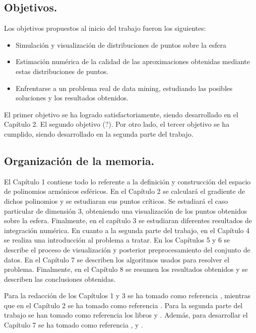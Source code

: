 \subsection{Objetivos.}
Los objetivos propuestos al inicio del trabajo fueron los siguientes:
\begin{itemize}
	\item Simulación y visualización de distribuciones de puntos sobre la esfera
	\item Estimación numérica de la calidad de las aproximaciones obtenidas mediante estas distribuciones de puntos. 
	\item Enfrentarse a un problema real de data mining, estudiando las posibles soluciones y los resultados obtenidos.
\end{itemize}

El primer objetivo se ha logrado satisfactoriamente, siendo desarrollado en el Capítulo 2. El segundo objetivo (?). 
Por otro lado, el tercer objetivo se ha cumplido, siendo desarrollado en la segunda parte del trabajo.

\subsection{Organización de la memoria.}
\medskip

El Capítulo 1 contiene todo lo referente a la definición y construcción del espacio de polinomios armónicos esféricos.
En el Capítulo 2 se calculará el gradiente de dichos polinomios y se estudiaran sus puntos críticos. Se estudiará el caso particular de dimensión 3, obteniendo una visualización de los puntos obtenidos sobre la esfera.
Finalmente, en el capítulo 3 se estudiaran diferentes resultados de integración numérica.
En cuanto a la segunda parte del trabajo, en el Capítulo 4 se realiza una introducción al problema a tratar. 
En los Capítulos 5 y 6 se describe el proceso de visualización y posterior preprocesamiento del conjunto de datos.
En el Capítulo 7 se describen los algoritmos usados para resolver el problema.
Finalmente, en el Capítulo 8 se resumen los resultados obtenidos y se describen las conclusiones obtenidas.

\medskip 

Para la redacción de los Capítulos 1 y 3 se ha tomado como referencia \cite{libro_esfarm}, mientras que en el Capítulo 2 se ha tomado como referencia \cite{art_grad}. Para la segunda parte del trabajo se han tomado como referencia los libros \cite{data_mining} y \cite[]{}. Además, para desarrollar el Capítulo 7 se ha tomado como referencia \cite{boosting}, \cite{rusboost} y \cite{cusboost}. 